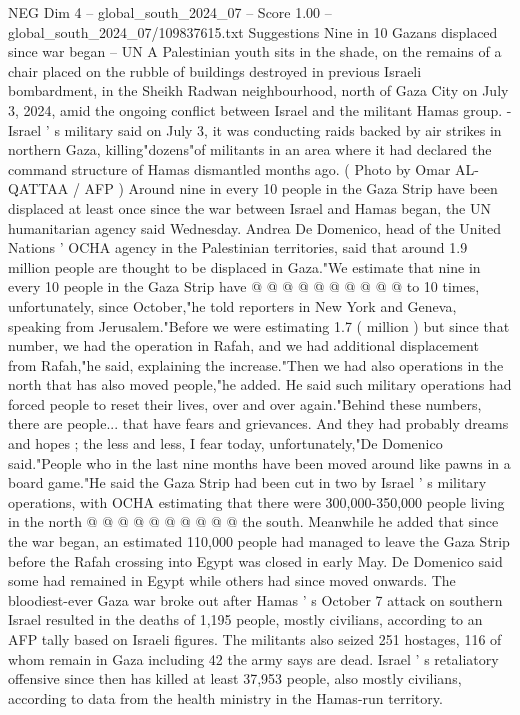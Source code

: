 \begin{textsample}{NEG Dim 4 – global\_south\_2024\_07 – Score 1.00 – global\_south\_2024\_07/109837615.txt}  \label{ex:f4_neg_346}
Suggestions Nine in 10 Gazans displaced since war began -- UN A Palestinian youth sits in the shade, on the remains of a chair placed on the rubble of buildings destroyed in previous Israeli bombardment, in the Sheikh Radwan neighbourhood, north of Gaza City on July 3, 2024, amid the ongoing conflict between Israel and the militant Hamas group. - Israel ' s military said on July 3, it was conducting raids backed by air strikes in northern Gaza, killing"dozens"of militants in an area where it had declared the command structure of Hamas dismantled months ago. ( Photo by Omar AL-QATTAA / AFP ) Around nine in every 10 people in the Gaza Strip have been displaced at least once since the war between Israel and Hamas began, the UN humanitarian agency said Wednesday.
Andrea De Domenico, head of the United Nations ' OCHA agency in the Palestinian territories, said that around 1.9 million people are thought to be displaced in Gaza."We estimate that nine in every 10 people in the Gaza Strip have @ @ @ @ @ @ @ @ @ @ to 10 times, unfortunately, since October,"he told reporters in New York and Geneva, speaking from Jerusalem."Before we were estimating 1.7 ( million ) but since that number, we had the operation in Rafah, and we had additional displacement from Rafah,"he said, explaining the increase."Then we had also operations in the north that has also moved people,"he added.
He said such military operations had forced people to reset their lives, over and over again."Behind these numbers, there are people... that have fears and grievances.
And they had probably dreams and hopes ; the less and less, I fear today, unfortunately,"De Domenico said."People who in the last nine months have been moved around like pawns in a board game."He said the Gaza Strip had been cut in two by Israel ' s military operations, with OCHA estimating that there were 300,000-350,000 people living in the north @ @ @ @ @ @ @ @ @ @ the south.
Meanwhile he added that since the war began, an estimated 110,000 people had managed to leave the Gaza Strip before the Rafah crossing into Egypt was closed in early May.
De Domenico said some had remained in Egypt while others had since moved onwards.
The bloodiest-ever Gaza war broke out after Hamas ' s October 7 attack on southern Israel resulted in the deaths of 1,195 people, mostly civilians, according to an AFP tally based on Israeli figures.
The militants also seized 251 hostages, 116 of whom remain in Gaza including 42 the army says are dead.
Israel ' s retaliatory offensive since then has killed at least 37,953 people, also mostly civilians, according to data from the health ministry in the Hamas-run territory.

\end{textsample}
